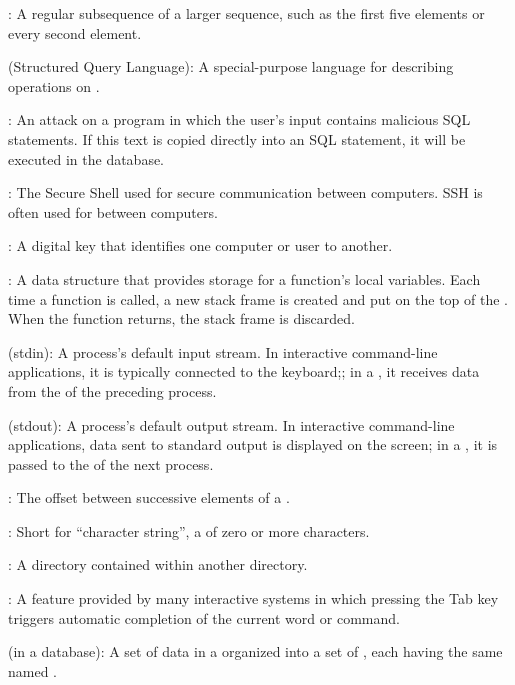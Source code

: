 :
A regular subsequence of a larger sequence, such as the
first five elements or every second element.

 (Structured Query Language):
A special-purpose language for
describing operations on .

:
An attack on a program in which the
user's input contains malicious SQL statements. If this text is copied
directly into an SQL statement, it will be executed in the database.

:
The Secure Shell  used for secure communication between computers.
SSH is often used for  between computers.

:
A digital key that identifies one computer or user to another.

:
A data structure that provides storage for a
function's local variables. Each time a function is called, a new stack
frame is created and put on the top of the . When the function returns, the stack frame is discarded.

 (stdin):
A process's default input stream. In
interactive command-line applications, it is typically connected to the
keyboard;; in a , it receives data from the
 of the preceding process.

 (stdout):
A process's default output stream. In
interactive command-line applications, data sent to standard output is
displayed on the screen; in a , it is passed to
the  of the next process.

:
The offset between successive elements of a
.

:
Short for ``character string'', a
 of zero or more characters.

:
A directory contained within another directory.

:
A feature provided by many interactive systems
in which pressing the Tab key triggers automatic completion of the
current word or command.

 (in a database):
A set of data in a
 organized into a
set of , each having the same named
.

